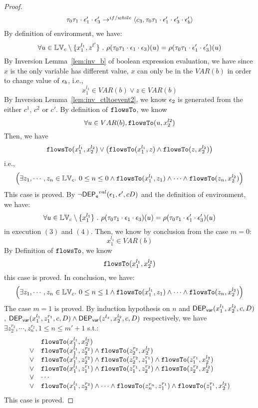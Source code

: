 {\begin{proof}
\[\begin{array}{l}
{  \ensuremath{\mathtt{\tau}}_0 \ensuremath{\mathtt{\tau}}_1 \cdot \ensuremath{\mathtt{\epsilon}}_1' \cdot \ensuremath{\mathtt{\epsilon}}_3'} 
  \rightarrow^{if / while} 
  \langle {c}_3,  \mathtt{\tau}_0 \mathtt{\tau}_1 \cdot \mathtt{\epsilon}_1' \cdot \mathtt{\epsilon}_3' \cdot \mathtt{\epsilon}_b' \rangle 
\end{array}
 \]
 By definition of environment, we have:
\[
  \forall u \in \mathbb{LV}_c \setminus \{x_1^{l_1}, z^{l'}\} ~.~
  \rho(\mathtt{\tau}_0 \mathtt{\tau}_1 \cdot \mathtt{\epsilon}_1 \cdot \mathtt{\epsilon}_3 ) (u) =  
  \rho(\mathtt{\tau}_0 \mathtt{\tau}_1 \cdot \mathtt{\epsilon}_1' \cdot \mathtt{\epsilon}_3') (u)
\]
%
By {Inversion Lemma~\ref{lem:inv_b}} of boolean expression evaluation, we have since $x$ is the only variable has different value, $x$ can only be in the $VAR(b)$ in order to change value of $\mathtt{\epsilon}_b$, i.e.,
 \[
  x_1^{l_1} \in VAR(b) \lor z \in VAR(b)
 \]
 By {Inversion Lemma~\ref{lem:inv_ctltoevent2}}, we know $\mathtt{\epsilon}_2$ is generated from the either $c^1$, $c^2$ or $c'$.
 By definition of $\mathtt{flowsTo}$, we know
 \[
 \forall u \in VAR(b), \mathtt{flowsTo}(u, x_2^{l2})
 \]
 Then, we have
 \[
  \mathtt{flowsTo}(x_1^{l_1}, x_2^{l_2}) \lor 
  \big(\mathtt{flowsTo}(x_1^{l_1}, z) \land \mathtt{flowsTo}(z, x_2^{l_2}) \big)
 \]
 i.e.,
 \[
 \Big( \exists z_1, \cdots, z_n \in \mathbb{LV}_{{c}}. ~ 0 \leq n \leq 0 \land
  \mathtt{flowsTo}(x_1^{l_1}, z_1) 
  \land \cdots \land \mathtt{flowsTo}(z_n, x_2^{l_2}) \Big)
 \]
 This case is proved.
%
%
By $\neg \mathsf{DEP_{\mathtt{e}}}^{val}(\mathtt{\epsilon}_1, \mathtt{\epsilon}', c D)$ and the definition of environment, we have:
\[
  \forall u \in \mathbb{LV}_c \setminus \{x_1^{l_1}\} ~.~
  \rho(\mathtt{\tau}_0 \mathtt{\tau}_1 \cdot \mathtt{\epsilon}_1 \cdot \mathtt{\epsilon}_3 ) (u) =  
  \rho(\mathtt{\tau}_0 \mathtt{\tau}_1 \cdot \mathtt{\epsilon}_1' \cdot \mathtt{\epsilon}_3') (u)
\]
in execution $(3)$ and $(4)$.
%
Then, we know by conclusion from the case $m = 0$:
\[
  x_1^{l_1} \in VAR(b)
\]
%
By Definition of $\mathtt{flowsTo}$, we know
\[
  \mathtt{flowsTo}(x_1^{l_1}, x_2^{l_2}) 
\]
this case is proved.
%
In conclusion, we have:
\[
  \Big( \exists z_1, \cdots, z_n \in \mathbb{LV}_{{c}}. ~ 0 \leq n \leq 1 \land
  \mathtt{flowsTo}(x_1^{l_1}, z_1) 
  \land \cdots \land \mathtt{flowsTo}(z_n, x_2^{l_2}) \Big)
\]
The case $m = 1$ is proved.
%
By induction hypothesis on $n$ and $\mathsf{DEP_{var}}(x_1^{l_1}, x_2^{l_2}, c, D)$, 
$\mathsf{DEP_{var}}(x_1^{l_1}, z_1^{r_1}, c, D) \land \mathsf{DEP_{var}}(z^{l_z}, x_2^{l_2}, c, D)$ respectively, 
we have $\exists z_2^{r_2}, \cdots, z_n^{r_2}, 1 \leq n \leq m'+1$ s.t.:
\[
\begin{array}{ll}
      & \mathtt{flowsTo}(x_1^{l_1}, x_2^{l_2}) \\
  \lor  & \mathtt{flowsTo}(x_1^{l_1}, z_2^{r_2}) \land \mathtt{flowsTo}(z_2^{r_2}, x_2^{l_2})\\
  \lor  & \mathtt{flowsTo}(x_1^{l_1}, z_2^{r_2}) \land \mathtt{flowsTo}(z_2^{r_2}, z_1^{r_1}) \land \mathtt{flowsTo}(z_1^{r_1}, x_2^{l_2}) \\
  \lor  & \mathtt{flowsTo}(x_1^{l_1}, z_1^{r_1}) \land \mathtt{flowsTo}(z_1^{r_1}, z_2^{r_2}) \land \mathtt{flowsTo}(z_2^{r_2}, x_2^{l_2}) \\
  \lor  & \cdots \\
  \lor  & \mathtt{flowsTo}(x_1^{l_1}, z_2^{r_2}) \land \cdots \land \mathtt{flowsTo}(z_n^{r_n}, z_1^{r_1}) \land \mathtt{flowsTo}(z_1^{r_1}, x_2^{l_2}) \\
\end{array}
\]This case is proved.
\end{proof}}